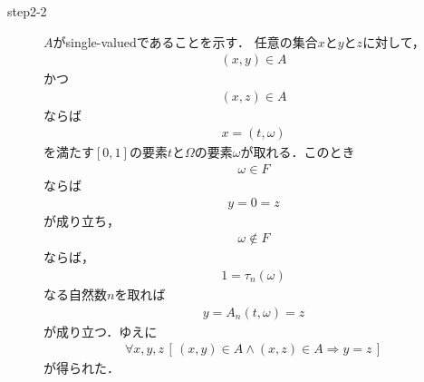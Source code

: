\begin{sketch}
\begin{description}
			\item[step2-2]
				$A$がsingle-valuedであることを示す．
				任意の集合$x$と$y$と$z$に対して，
				\begin{align}
					(x,y) \in A
				\end{align}
				かつ
				\begin{align}
					(x,z) \in A
				\end{align}
				ならば
				\begin{align}
					x = (t,\omega)
				\end{align}
				を満たす$[0,1]$の要素$t$と$\Omega$の要素$\omega$が取れる．このとき
				\begin{align}
					\omega \in F
				\end{align}
				ならば
				\begin{align}
					y = 0 = z
				\end{align}
				が成り立ち，
				\begin{align}
					\omega \notin F
				\end{align}
				ならば，
				\begin{align}
					1 = \tau_{n}(\omega)
				\end{align}
				なる自然数$n$を取れば
				\begin{align}
					y = A_{n}(t,\omega) = z
				\end{align}
				が成り立つ．ゆえに
				\begin{align}
					\forall x,y,z\, \left[\, 
					(x,y) \in A \wedge (x,z) \in A \Longrightarrow y = z\, \right]
				\end{align}
				が得られた．
				

\end{description}
\end{sketch}
